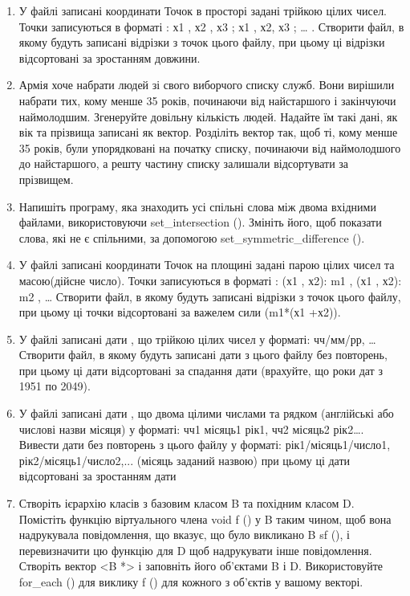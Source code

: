 \documentclass[a5paper,titlepage,openany,twoside,
]
{book_unv}%
\begin{document}
\begin{enumerate}
\def\labelenumi{\arabic{enumi})}
\setcounter{enumi}{8}
\item
  У файлі записані координати Точок в просторі задані трійкою цілих
  чисел. Точки записуються в форматі : х1 , х2 , х3 ; х1 , х2, х3 ;
  \ldots{} . Створити файл, в якому будуть записані відрізки з точок цього файлу, при
цьому ці відрізки відсортовані за зростанням довжини.

\item
  Армія хоче набрати людей зі свого виборчого списку служб. Вони
  вирішили набрати тих, кому менше 35 років, починаючи
  від найстаршого і закінчуючи наймолодшим. Згенеруйте довільну кількість
  людей. Надайте їм такі дані, як вік та прізвища записані як вектор.
  Розділіть вектор так, щоб ті, кому менше 35 років, були
  упорядковані на початку списку, починаючи від наймолодшого до
  найстаршого, а решту частину списку залишали відсортувати за прізвищем.

\item
  Напишіть програму, яка знаходить усі спільні слова між двома вхідними
  файлами, використовуючи set\_intersection (). Змініть його, щоб
  показати слова, які не є спільними, за допомогою
  set\_symmetric\_difference ().

\item
  У файлі записані координати Точок на площині задані парою цілих чисел
  та масою(дійсне число). Точки записуються в форматі : (х1 , х2): m1 ,
  (х1 , х2): m2 , \ldots{} Створити файл, в якому будуть записані
  відрізки з точок цього файлу, при цьому ці точки відсортовані за
  важелем сили (m1*(х1 +х2)).
\item
  У файлі записані дати , що трійкою цілих чисел у форматі: чч/мм/рр,
  \ldots{} Створити файл, в якому будуть записані дати з цього файлу без
  повторень, при цьому ці дати відсортовані за спадання дати (врахуйте,
  що роки дат з 1951 по 2049).
\item
  У файлі записані дати , що двома цілими числами та рядком (англійські
  або числові назви місяця) у форматі: чч1 місяць1 рік1, чч2 місяць2
  рік2\ldots{}. Вивести дати без повторень з цього файлу у форматі:
  рік1/місяць1/число1, рік2/місяць1/число2,... (місяць заданий назвою)
  при цьому ці дати відсортовані за зростанням дати
\item
  Створіть ієрархію класів з базовим класом B та похідним класом D.
  Помістіть функцію віртуального члена void f () у B таким чином, щоб
  вона надрукувала повідомлення, що вказує, що було викликано B sf (), і
  перевизначити цю функцію для D щоб надрукувати інше повідомлення.
  Створіть вектор \textless{}B *\textgreater{} і заповніть його
  об'єктами B і D. Використовуйте for\_each () для виклику f () для
  кожного з об'єктів у вашому векторі.


\end{enumerate}
\end{document}
